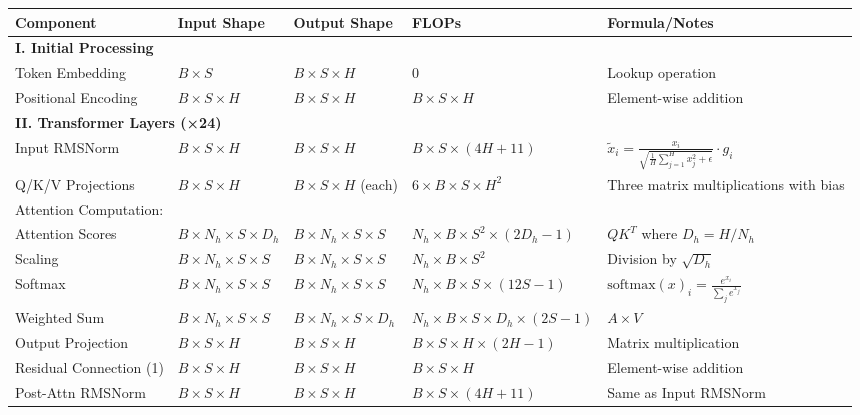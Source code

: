 \documentclass[11pt]{article}
\begin{document}
\begin{landscape}
\begin{table}[h!]
\centering
\renewcommand{\arraystretch}{1.3}
\small
\begin{tabular}{lllll}
\toprule
\textbf{Component} & \textbf{Input Shape} & \textbf{Output Shape} & \textbf{FLOPs} & \textbf{Formula/Notes} \\
\midrule
\multicolumn{5}{l}{\textbf{I. Initial Processing}} \\
\midrule
Token Embedding & $B \times S$ & $B \times S \times H$ & 0 & Lookup operation \\
Positional Encoding & $B \times S \times H$ & $B \times S \times H$ & $B \times S \times H$ & Element-wise addition \\
\midrule
\multicolumn{5}{l}{\textbf{II. Transformer Layers (×24)}} \\
\midrule
Input RMSNorm & $B \times S \times H$ & $B \times S \times H$ & $B \times S \times (4H + 11)$ & $\tilde{x}_i = \frac{x_i}{\sqrt{\frac{1}{H} \sum_{j=1}^H x_j^2 + \epsilon}} \cdot g_i$ \\
\midrule
Q/K/V Projections & $B \times S \times H$ & $B \times S \times H$ (each) & $6 \times B \times S \times H^2$ & Three matrix multiplications with bias \\
\midrule
Attention Computation: & & & & \\
\quad Attention Scores & $B \times N_h \times S \times D_h$ & $B \times N_h \times S \times S$ & $N_h \times B \times S^2 \times (2D_h - 1)$ & $QK^T$ where $D_h = H/N_h$ \\
\quad Scaling & $B \times N_h \times S \times S$ & $B \times N_h \times S \times S$ & $N_h \times B \times S^2$ & Division by $\sqrt{D_h}$ \\
\quad Softmax & $B \times N_h \times S \times S$ & $B \times N_h \times S \times S$ & $N_h \times B \times S \times (12S - 1)$ & $\text{softmax}(x)_i = \frac{e^{x_i}}{\sum_j e^{x_j}}$ \\
\quad Weighted Sum & $B \times N_h \times S \times S$ & $B \times N_h \times S \times D_h$ & $N_h \times B \times S \times D_h \times (2S - 1)$ & $A \times V$ \\
\quad Output Projection & $B \times S \times H$ & $B \times S \times H$ & $B \times S \times H \times (2H - 1)$ & Matrix multiplication \\
\midrule
Residual Connection (1) & $B \times S \times H$ & $B \times S \times H$ & $B \times S \times H$ & Element-wise addition \\
\midrule
Post-Attn RMSNorm & $B \times S \times H$ & $B \times S \times H$ & $B \times S \times (4H + 11)$ & Same as Input RMSNorm \\

\end{tabular}
\end{table}
\end{landscape}
\end{document}

